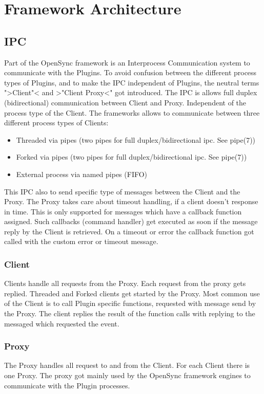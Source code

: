 \chapter{Framework Architecture}

\section{IPC}
Part of the OpenSync framework is an Interprocess Communication system to
communicate with the Plugins. To avoid confusion between the different process
types of Plugins, and to make the IPC independent of Plugins, the neutral terms
">Client"< and >"Client Proxy<" got introduced. The IPC is allows full duplex 
(bidirectional) communication between Client and Proxy. Independent of the 
process type of the Client. The frameworks allows to communicate between three 
different process types of Clients:
\begin{itemize}
\item Threaded via pipes (two pipes for full duplex/bidirectional ipc. See
pipe(7))
\item Forked via pipes (two pipes for full duplex/bidirectional ipc. See pipe(7))
\item External process via named pipes (FIFO)
\end{itemize}
This IPC also to send specific type of messages between the Client and the
Proxy. The Proxy takes care about timeout handling, if a client doesn't
response in time. This is only supported for messages which have a callback
function assigned. Such callbacks (command handler) get executed as soon if the
message reply by the Client is retrieved. On a timeout or error the callback
function got called with the custom error or timeout message.

\subsection{Client}
Clients handle all requests from the Proxy. Each request from the proxy gets
replied. Threaded and Forked clients get started by the Proxy. Most common use of
the Client is to call Plugin specific functions, requested with message send by
the Proxy. The client replies the result of the function calls with replying to
the messaged which requested the event.

\subsection{Proxy}
The Proxy handles all request to and from the Client. For each Client there is
one Proxy. The proxy got mainly used by the OpenSync framework engines to
communicate with the Plugin processes.

